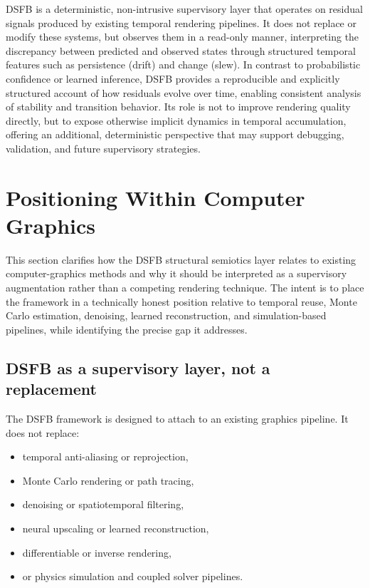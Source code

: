 \documentclass[11pt,letterpaper]{article}
\theoremstyle{gcresult}
\theoremstyle{definition}
\begin{document}
DSFB is a deterministic, non-intrusive supervisory layer that operates on residual signals produced by existing temporal rendering pipelines. It does not replace or modify these systems, but observes them in a read-only manner, interpreting the discrepancy between predicted and observed states through structured temporal features such as persistence (drift) and change (slew). In contrast to probabilistic confidence or learned inference, DSFB provides a reproducible and explicitly structured account of how residuals evolve over time, enabling consistent analysis of stability and transition behavior. Its role is not to improve rendering quality directly, but to expose otherwise implicit dynamics in temporal accumulation, offering an additional, deterministic perspective that may support debugging, validation, and future supervisory strategies.


\section{Positioning Within Computer Graphics}
\label{sec:positioning}

This section clarifies how the DSFB structural semiotics layer relates to existing computer-graphics methods and why it should be interpreted as a supervisory augmentation rather than a competing rendering technique. The intent is to place the framework in a technically honest position relative to temporal reuse, Monte Carlo estimation, denoising, learned reconstruction, and simulation-based pipelines, while identifying the precise gap it addresses.


\subsection{DSFB as a supervisory layer, not a replacement}

The DSFB framework is designed to attach to an existing graphics pipeline. It does not replace:
\begin{itemize}[leftmargin=1.5em]
    \item temporal anti-aliasing or reprojection,
    \item Monte Carlo rendering or path tracing,
    \item denoising or spatiotemporal filtering,
    \item neural upscaling or learned reconstruction,
    \item differentiable or inverse rendering,
    \item or physics simulation and coupled solver pipelines.
\end{itemize}
\end{document}
